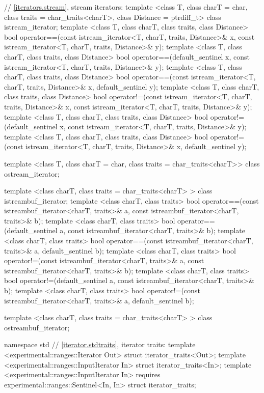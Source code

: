 \begin{codeblock}
{{{{  // \ref{iterators.stream}, stream iterators:
  template <class T, class charT = char, class traits = char_traits<charT>,
      class Distance = ptrdiff_t>
  class istream_iterator;
  template <class T, class charT, class traits, class Distance>
    bool operator==(const istream_iterator<T, charT, traits, Distance>& x,
            const istream_iterator<T, charT, traits, Distance>& y);
  template <class T, class charT, class traits, class Distance>
    bool operator==(default_sentinel x,
            const istream_iterator<T, charT, traits, Distance>& y);
  template <class T, class charT, class traits, class Distance>
    bool operator==(const istream_iterator<T, charT, traits, Distance>& x,
            default_sentinel y);
  template <class T, class charT, class traits, class Distance>
    bool operator!=(const istream_iterator<T, charT, traits, Distance>& x,
            const istream_iterator<T, charT, traits, Distance>& y);
  template <class T, class charT, class traits, class Distance>
   bool operator!=(default_sentinel x,
            const istream_iterator<T, charT, traits, Distance>& y);
  template <class T, class charT, class traits, class Distance>
    bool operator!=(const istream_iterator<T, charT, traits, Distance>& x,
            default_sentinel y);

  template <class T, class charT = char, class traits = char_traits<charT>>
      class ostream_iterator;

  template <class charT, class traits = char_traits<charT> >
    class istreambuf_iterator;
  template <class charT, class traits>
    bool operator==(const istreambuf_iterator<charT, traits>& a,
            const istreambuf_iterator<charT, traits>& b);
  template <class charT, class traits>
    bool operator==(default_sentinel a,
            const istreambuf_iterator<charT, traits>& b);
  template <class charT, class traits>
    bool operator==(const istreambuf_iterator<charT, traits>& a,
            default_sentinel b);
  template <class charT, class traits>
    bool operator!=(const istreambuf_iterator<charT, traits>& a,
            const istreambuf_iterator<charT, traits>& b);
  template <class charT, class traits>
    bool operator!=(default_sentinel a,
            const istreambuf_iterator<charT, traits>& b);
  template <class charT, class traits>
    bool operator!=(const istreambuf_iterator<charT, traits>& a,
            default_sentinel b);

  template <class charT, class traits = char_traits<charT> >
    class ostreambuf_iterator;
}}}}

namespace std {
  // \ref{iterator.stdtraits}, iterator traits:
  template <experimental::ranges::Iterator Out>
    struct iterator_traits<Out>;
  template <experimental::ranges::InputIterator In>
    struct iterator_traits<In>;
  template <experimental::ranges::InputIterator In>
      requires experimental::ranges::Sentinel<In, In>
    struct iterator_traits;
}
\end{codeblock}


